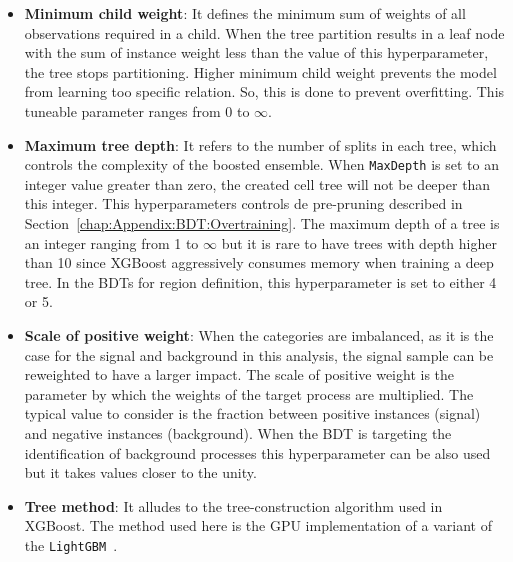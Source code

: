 \begin{itemize}
\begin{itemize}
		\item \textbf{Minimum child weight}: 
		It defines the minimum sum of weights of all observations required in a child.
		When the tree partition results in a leaf node with the sum of instance weight less than the value of 
		this hyperparameter, the tree stops partitioning. Higher minimum child weight prevents the model from learning
		too specific relation. So, this is done to prevent overfitting. This tuneable parameter ranges from 0 to $\infty$.
		
		\item \textbf{Maximum tree depth}: It refers to the number of splits in each tree, which controls the complexity 
		of the boosted ensemble. 
		When \texttt{MaxDepth} is set to an integer value greater than zero, the created cell tree will not be deeper than this integer.
		This hyperparameters controls de pre-pruning described in Section~\ref{chap:Appendix:BDT:Overtraining}.
		The maximum depth of a tree is an integer ranging from 1 to $\infty$ but it is rare to have trees
		with depth higher than 10 since XGBoost aggressively consumes memory when training a deep tree.
		In the BDTs for region definition, this hyperparameter is set to either 4 or 5. 
		
		\item \textbf{Scale of positive weight}: When the categories are imbalanced, as it is the case for the signal
		and background in this analysis, the signal sample can be reweighted to have a larger impact. 
		The scale of positive weight is the parameter by which the weights of the target process are multiplied.  
		The typical value to consider is the fraction between positive instances (signal) and negative instances (background). 
		When the BDT is targeting the identification of background processes this hyperparameter can be also used but
		it takes values closer to the unity.
		
		
		
		
		
		\item \textbf{Tree method}: It alludes to the tree-construction algorithm used in XGBoost.  
		The method used here is the GPU implementation of a variant of the \texttt{LightGBM}~\cite{ke2017lightgbm, Chen_2016}.

		
		
	\end{itemize}
\end{itemize}


